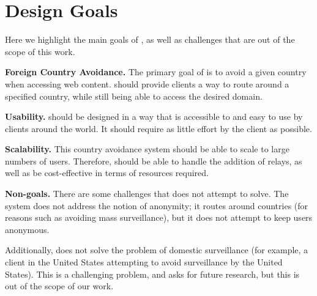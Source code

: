 \section{Design Goals}

Here we highlight the main goals of \system{}, as well as challenges that are out 
of the scope of this work.

{\bf Foreign Country Avoidance.}  The primary goal of \system{} is to avoid a given
 country when accessing web content.  \system{} should provide clients a way to 
route around a specified country, while still being able to access the desired 
domain.

{\bf Usability.} \system{} should be designed in a way that is accessible to and 
easy to use by clients around the world.  It should require as little effort by 
the client as possible.

{\bf Scalability.}  This country avoidance system should be able to scale to 
large numbers of users.  Therefore, \system{} should be able to handle the addition
 of relays, as well as be cost-effective in terms of resources required.

{\bf Non-goals.}  There are some challenges that \system{} does not attempt to 
solve.  The system does not address the notion of anonymity; it routes around 
countries (for reasons such as avoiding mass surveillance), but it does not 
attempt to keep users anonymous.  

Additionally, \system{} does not solve the problem of domestic surveillance (for 
example, a client in the United States attempting to avoid surveillance by the 
United States).  This is a challenging problem, and asks for future research, 
but this is out of the scope of our work.

